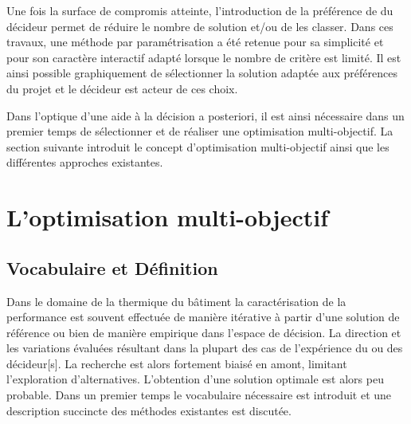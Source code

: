 Une fois la surface de compromis atteinte, l’introduction de la préférence de
du décideur permet de réduire le nombre de solution et/ou de les classer.
Dans ces travaux, une méthode par paramétrisation a été retenue pour sa simplicité
et pour son caractère interactif adapté lorsque le nombre de critère est limité. Il est
ainsi possible graphiquement de sélectionner la solution adaptée aux préférences
du projet et le décideur est acteur de ces choix.

Dans l’optique d’une aide à la décision a posteriori, il est ainsi nécessaire
dans un premier temps de sélectionner et de réaliser une optimisation multi-objectif.
La section suivante introduit le concept d’optimisation multi-objectif ainsi que
les différentes approches existantes.



\section{L’optimisation multi-objectif} %
\label{sec:l_optimisation_multi_objectif}
\subsection{Vocabulaire et Définition} %
\label{sub:vocabulaire_et_definition}
Dans le domaine de la thermique du bâtiment la caractérisation de la performance
est souvent effectuée de manière itérative à partir d’une solution de référence
ou bien de manière empirique dans l’espace de décision. La direction et les
variations évaluées résultant dans la plupart des cas de l’expérience du ou des
décideur[s]. La recherche est alors fortement biaisé en amont, limitant
l’exploration d’alternatives. L’obtention d’une solution optimale est alors
peu probable. Dans un premier temps le vocabulaire nécessaire est introduit et
une description succincte des méthodes existantes est discutée.

